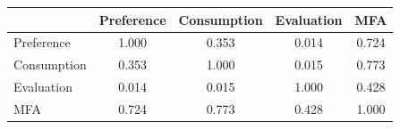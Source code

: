 \begin{tabular}{lcccc}
\toprule
 & Preference & Consumption & Evaluation & MFA \\
\midrule
Preference & 1.000 & 0.353 & 0.014 & 0.724 \\
Consumption & 0.353 & 1.000 & 0.015 & 0.773 \\
Evaluation & 0.014 & 0.015 & 1.000 & 0.428 \\
MFA & 0.724 & 0.773 & 0.428 & 1.000 \\
\bottomrule
\end{tabular}
